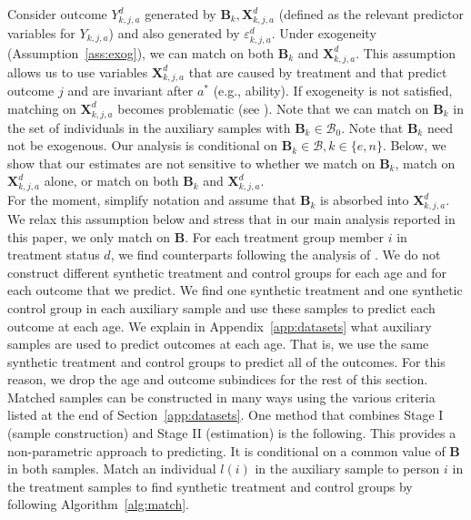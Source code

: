 \noindent Consider outcome $Y^d_{k,j,a}$ generated by $\bm{B}_k, \bm{X}^d_{k,j,a}$ (defined as the relevant predictor variables for $Y_{k,j,a}$) and also generated by $\varepsilon^d_{k,j,a}$. Under exogeneity (Assumption~\ref{ass:exog}), we can match on both $\bm{B}_k$ and $\bm{X}^d_{k,j,a}$. This assumption allows us to  use variables $\bm{X}^d_{k,j,a}$ that are caused by treatment and that predict outcome $j$ and are invariant after $a^\ast$ (e.g., ability). If exogeneity is not satisfied, matching on $\bm{X}^d_{k,j,a}$ becomes problematic (see \citealp{Heckman_Navarro_2004_REStat}). Note that we can match on $\bm{B}_k$ in the set of individuals in the auxiliary samples with $\bm{B}_k \in \mathcal{B}_{0}$. Note that $\bm{B}_k$ need not be exogenous. Our analysis is conditional on $\bm{B}_k \in \mathcal{B}, k \in \{e,n\}$. Below, we show that our estimates are not sensitive to whether we match on $\bm{B}_k$, match on $\bm{X}^d_{k,j,a}$ alone, or match on both $\bm{B}_k$ and $\bm{X}^d_{k,j,a}$.\\

\noindent For the moment, simplify notation and assume that $\bm{B}_k$ is absorbed into $\bm{X}^d_{k,j,a}$. We relax this assumption below and stress that in our main analysis reported in this paper, we only match on $\bm{B}$. For each treatment group member $i$ in treatment status $d$, we find counterparts following the analysis of \citet{Heckman_Ichimura_etal_1998_REStud}. We do not construct different synthetic treatment and control groups for each age and for each outcome that we predict. We find one synthetic treatment and one synthetic control group in each auxiliary sample and use these samples to predict each outcome at each age. We explain in Appendix~\ref{app:datasets} what auxiliary samples are used to predict outcomes at each age. That is, we use the same synthetic treatment and control groups to predict all of the outcomes. For this reason, we drop the age and outcome subindices for the rest of this section.\\

\noindent Matched samples can be constructed in many ways using the various criteria listed at the end of Section~\ref{app:datasets}. One method that combines Stage I (sample construction) and Stage II (estimation) is the following. This provides a non-parametric approach to predicting. It is conditional on a common value of $\bm{B}$ in both samples. Match an individual $l(i)$ in the auxiliary sample to person $i$ in the treatment samples to find synthetic treatment and control groups by following Algorithm~\ref{alg:match}.\\


